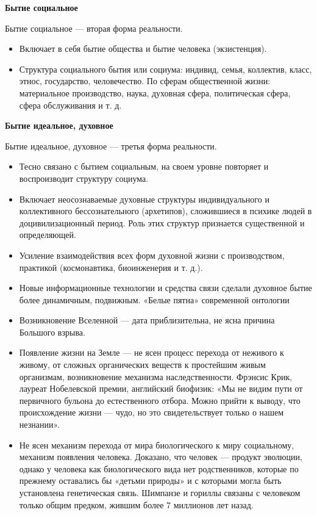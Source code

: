 \documentclass[12pt]{article}
\begin{document}
\textbf{Бытие социальное}

Бытие социальное — вторая форма реальности.
\begin{itemize}
\item Включает в себя бытие общества и бытие человека (экзистенция).
\item  Структура  социального  бытия  или  социума:  индивид,  семья,  коллектив,  класс,  этнос,  государство,
человечество.  По  сферам  общественной  жизни:  материальное  производство,  наука,  духовная  сфера,
политическая сфера, сфера обслуживания и т. д.
\end{itemize}

\textbf{Бытие идеальное, духовное}

Бытие идеальное, духовное — третья форма реальности.
\begin{itemize}
\item Тесно связано с бытием социальным, на своем уровне повторяет и воспроизводит структуру социума.
    \item  Включает  неосознаваемые  духовные  структуры  индивидуального  и  коллективного  бессознательного
(архетипов),  сложившиеся  в  психике  людей  в  доцивилизационный  период.  Роль  этих  структур  признается
существенной и определяющей.
    \item  Усиление  взаимодействия  всех  форм  духовной  жизни  с  производством,  практикой  (космонавтика,
биоинженерия и т. д.).
    \item  Новые  информационные  технологии  и  средства  связи  сделали  духовное  бытие  более  динамичным,
подвижным.
«Белые пятна» современной онтологии
\item Возникновение Вселенной — дата приблизительна, не ясна причина Большого взрыва.
\item Появление жизни на Земле — не ясен процесс перехода от неживого к живому, от сложных органических
веществ к простейшим живым организмам, возникновение механизма наследственности.
Фрэнсис Крик, лауреат Нобелевской премии, английский биофизик: «Мы не видим пути от первичного бульона
до естественного отбора. Можно прийти к выводу, что происхождение жизни — чудо, но это свидетельствует
только о нашем незнании».
\item Не ясен механизм перехода от мира биологического к миру социальному, механизм появления человека.
Доказано, что человек — продукт эволюции, однако у человека как биологического вида нет родственников,
которые по прежнему оставались бы «детьми природы» и с которыми могла быть установлена генетическая
связь. Шимпанзе и гориллы связаны с человеком только общим предком, жившим более 7 миллионов лет назад.
\end{itemize}
\end{document}
